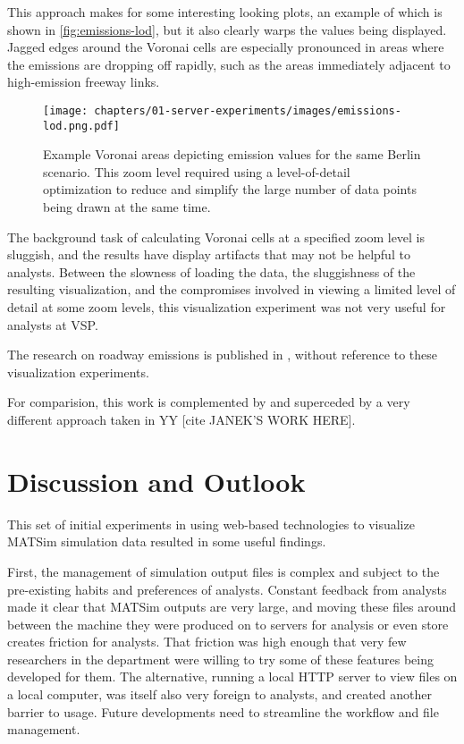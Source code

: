 This approach makes for some interesting looking plots, an example of which is shown in \autoref{fig:emissions-lod}, but it also clearly warps the values being displayed. Jagged edges around the Voronai cells are especially pronounced in areas where the emissions are dropping off rapidly, such as the areas immediately adjacent to high-emission freeway links.

\begin{figure}[!ht]
  \texttt{[image: chapters/01-server-experiments/images/emissions-lod.png.pdf]}
  \caption[Example Voronai areas depicting emission values for a Berlin scenario]{Example Voronai areas depicting emission values for the same Berlin scenario. This zoom level required using a level-of-detail optimization to reduce and simplify the large number of data points being drawn at the same time.}
  \label{fig:emissions-lod}
\end{figure}

The background task of calculating Voronai cells at a specified zoom level is sluggish, and the results have display artifacts that may not be helpful to analysts. Between the slowness of loading the data, the sluggishness of the resulting visualization, and the compromises involved in viewing a limited level of detail at some zoom levels, this visualization experiment was not very useful for analysts at VSP.

The research on roadway emissions is published in \cite{kaddoura2022exhaust}, without reference to these visualization experiments.

For comparision, this work is complemented by and superceded by a very different approach taken in YY [cite JANEK'S WORK HERE].

\hypertarget{server-experiments-findings}{%
\section{Discussion and Outlook}\label{server-experiments-findings}}

This set of initial experiments in using web-based technologies to visualize MATSim simulation data resulted in some useful findings.

First, the management of simulation output files is complex and subject to the pre-existing habits and preferences of analysts. Constant feedback from analysts made it clear that MATSim outputs are very large, and moving these files around between the machine they were produced on to servers for analysis or even store creates friction for analysts. That friction was high enough that very few researchers in the department were willing to try some of these features being developed for them. The alternative, running a local HTTP server to view files on a local computer, was itself also very foreign to analysts, and created another barrier to usage. Future developments need to streamline the workflow and file management.

